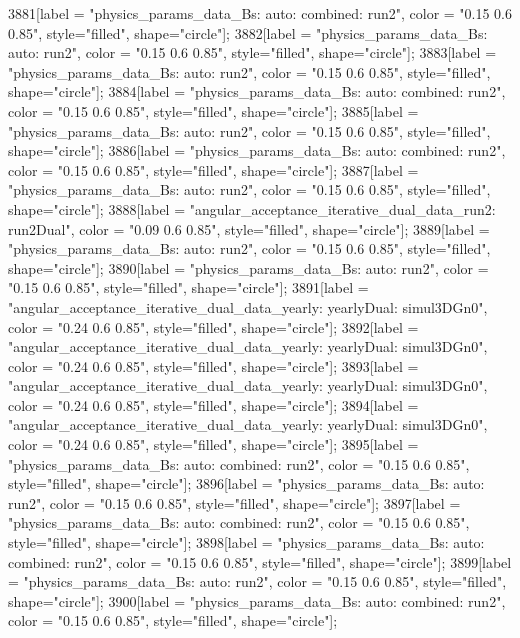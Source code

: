 {	3881[label = "physics_params_data_Bs\nfit: auto\ntrigger: combined\nyear: run2", color = "0.15 0.6 0.85", style="filled", shape="circle"];
	3882[label = "physics_params_data_Bs\nfit: auto\nyear: run2", color = "0.15 0.6 0.85", style="filled", shape="circle"];
	3883[label = "physics_params_data_Bs\nfit: auto\nyear: run2", color = "0.15 0.6 0.85", style="filled", shape="circle"];
	3884[label = "physics_params_data_Bs\nfit: auto\ntrigger: combined\nyear: run2", color = "0.15 0.6 0.85", style="filled", shape="circle"];
	3885[label = "physics_params_data_Bs\nfit: auto\nyear: run2", color = "0.15 0.6 0.85", style="filled", shape="circle"];
	3886[label = "physics_params_data_Bs\nfit: auto\ntrigger: combined\nyear: run2", color = "0.15 0.6 0.85", style="filled", shape="circle"];
	3887[label = "physics_params_data_Bs\nfit: auto\nyear: run2", color = "0.15 0.6 0.85", style="filled", shape="circle"];
	3888[label = "angular_acceptance_iterative_dual_data_run2\nangacc: run2Dual", color = "0.09 0.6 0.85", style="filled", shape="circle"];
	3889[label = "physics_params_data_Bs\nfit: auto\nyear: run2", color = "0.15 0.6 0.85", style="filled", shape="circle"];
	3890[label = "physics_params_data_Bs\nfit: auto\nyear: run2", color = "0.15 0.6 0.85", style="filled", shape="circle"];
	3891[label = "angular_acceptance_iterative_dual_data_yearly\nangacc: yearlyDual\ntimeacc: simul3DGn0", color = "0.24 0.6 0.85", style="filled", shape="circle"];
	3892[label = "angular_acceptance_iterative_dual_data_yearly\nangacc: yearlyDual\ntimeacc: simul3DGn0", color = "0.24 0.6 0.85", style="filled", shape="circle"];
	3893[label = "angular_acceptance_iterative_dual_data_yearly\nangacc: yearlyDual\ntimeacc: simul3DGn0", color = "0.24 0.6 0.85", style="filled", shape="circle"];
	3894[label = "angular_acceptance_iterative_dual_data_yearly\nangacc: yearlyDual\ntimeacc: simul3DGn0", color = "0.24 0.6 0.85", style="filled", shape="circle"];
	3895[label = "physics_params_data_Bs\nfit: auto\ntrigger: combined\nyear: run2", color = "0.15 0.6 0.85", style="filled", shape="circle"];
	3896[label = "physics_params_data_Bs\nfit: auto\nyear: run2", color = "0.15 0.6 0.85", style="filled", shape="circle"];
	3897[label = "physics_params_data_Bs\nfit: auto\ntrigger: combined\nyear: run2", color = "0.15 0.6 0.85", style="filled", shape="circle"];
	3898[label = "physics_params_data_Bs\nfit: auto\ntrigger: combined\nyear: run2", color = "0.15 0.6 0.85", style="filled", shape="circle"];
	3899[label = "physics_params_data_Bs\nfit: auto\nyear: run2", color = "0.15 0.6 0.85", style="filled", shape="circle"];
	3900[label = "physics_params_data_Bs\nfit: auto\ntrigger: combined\nyear: run2", color = "0.15 0.6 0.85", style="filled", shape="circle"];
}
